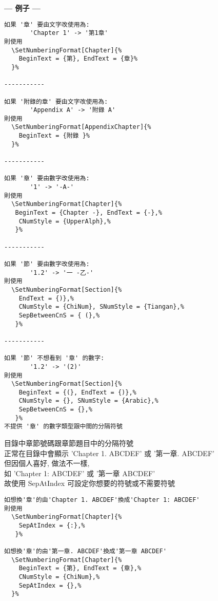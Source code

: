 \begin{enumerate}
{    \textbf{--- 例子 ---}
    \begin{DescriptionFrame}
    \begin{verbatim}
如果 '章' 要由文字改使用為:
       'Chapter 1' -> '第1章'
則使用
  \SetNumberingFormat[Chapter]{%
    BeginText = {第}, EndText = {章}%
  }%
   
-----------
   
如果 '附錄的章' 要由文字改使用為:
       'Appendix A' -> '附錄 A'
則使用
  \SetNumberingFormat[AppendixChapter]{%
    BeginText = {附錄 }%
  }%
   
-----------

如果 '章' 要由數字改使用為:
       '1' -> '-A-'
則使用
  \SetNumberingFormat[Chapter]{%
   BeginText = {Chapter -}, EndText = {-},%
    CNumStyle = {UpperAlph},%
   }%
   
-----------
   
如果 '節' 要由數字改使用為:
       '1.2' -> '一 -乙-'
則使用
  \SetNumberingFormat[Section]{%
    EndText = {)},%
    CNumStyle = {ChiNum}, SNumStyle = {Tiangan},%
    SepBetweenCnS = { (},%
   }%
   
-----------
   
如果 '節' 不想看到 '章' 的數字:
       '1.2' -> '(2)'
則使用
  \SetNumberingFormat[Section]{%
    BeginText = {(}, EndText = {)},%
    CNumStyle = {}, SNumStyle = {Arabic},%
    SepBetweenCnS = {},%
   }%
不提供 '章' 的數字類型跟中間的分隔符號
    \end{verbatim}
    \end{DescriptionFrame}

    目錄中章節號碼跟章節題目中的分隔符號\\
    正常在目錄中會顯示 'Chapter 1. ABCDEF' 或 '第一章. ABCDEF'\\
    但因個人喜好, 做法不一樣,\\
    如 'Chapter 1: ABCDEF' 或 '第一章 ABCDEF'\\
    故使用 SepAtIndex 可設定你想要的符號或不需要符號
    \begin{DescriptionFrame}
    \begin{verbatim}
如想換'章'的由'Chapter 1. ABCDEF'換成'Chapter 1: ABCDEF'
則使用
  \SetNumberingFormat[Chapter]{%
    SepAtIndex = {:},%
   }%
   
如想換'章'的由'第一章. ABCDEF'換成'第一章 ABCDEF'
  \SetNumberingFormat[Chapter]{%
    BeginText = {第}, EndText = {章},%
    CNumStyle = {ChiNum},%
    SepAtIndex = {},%
  }%
    \end{verbatim}
    \end{DescriptionFrame}
  } %


\end{enumerate}
